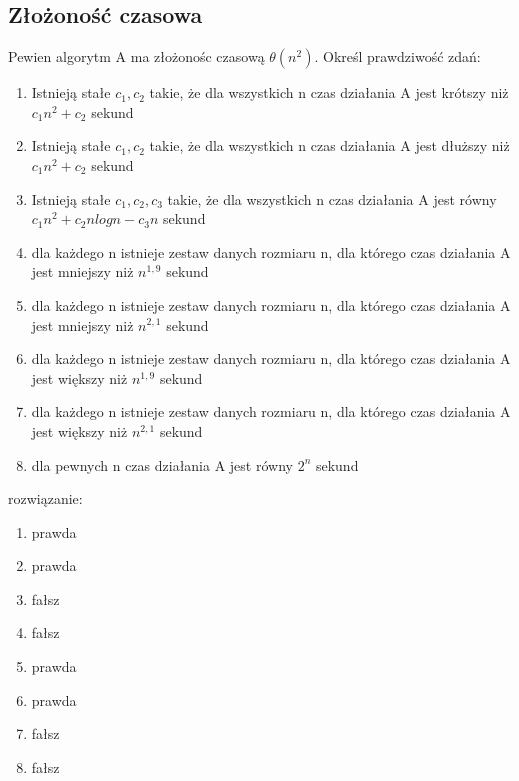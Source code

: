 \documentclass{article}
\begin{document}
\subsection*{Złożoność czasowa}
Pewien algorytm A ma złożonośc czasową $\theta(n^2)$. Określ prawdziwość zdań:
\begin{enumerate}
	\item Istnieją stałe $c_1, c_2$ takie, że dla wszystkich n czas działania A jest krótszy niż $c_1n^2 + c_2$ sekund
	\item Istnieją stałe $c_1, c_2$ takie, że dla wszystkich n czas działania A jest dłuższy niż $c_1n^2 + c_2$ sekund
	\item Istnieją stałe $c_1, c_2, c_3$ takie, że dla wszystkich n czas działania A jest równy $c_1n^2 + c_2nlogn -c_3n$ sekund
	\item dla każdego n istnieje zestaw danych rozmiaru n, dla którego czas działania A jest mniejszy niż $n^{1,9}$ sekund
	\item dla każdego n istnieje zestaw danych rozmiaru n, dla którego czas działania A jest mniejszy niż $n^{2,1}$ sekund
	\item dla każdego n istnieje zestaw danych rozmiaru n, dla którego czas działania A jest większy niż $n^{1,9}$ sekund
	\item dla każdego n istnieje zestaw danych rozmiaru n, dla którego czas działania A jest większy niż $n^{2,1}$ sekund
	\item dla pewnych n czas działania A jest równy $2^n$ sekund
\end{enumerate}
rozwiązanie:\\

\begin{enumerate}
	\item prawda
	\item prawda
	\item fałsz
	\item fałsz
	\item prawda
	\item prawda
	\item fałsz
	\item fałsz
\end{enumerate}
\end{document}
